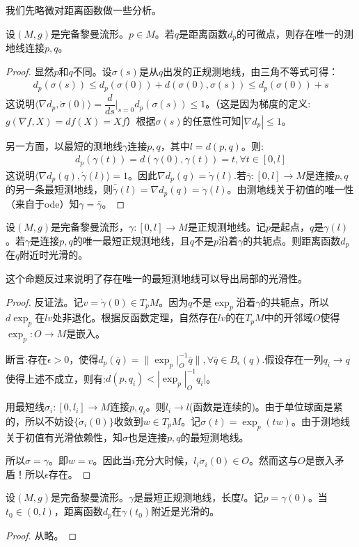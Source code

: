 我们先略微对距离函数做一些分析。
\begin{proposition}
    设$(M,g)$是完备黎曼流形。$p \in M$。若$q$是距离函数$d_p$的可微点，则存在唯一的测地线连接$p,q$。
\end{proposition}
\begin{proof}
    显然$p$和$q$不同。设$\sigma(s)$是从$q$出发的正规测地线，由三角不等式可得：
    \begin{align*}
        d_p(\sigma(s))\leq d_p(\sigma(0))+d(\sigma(0),\sigma(s))\leq d_p(\sigma(0))+s
    \end{align*}
    这说明$\langle \nabla d_p,\dot{\sigma}(0)\rangle =\dfrac{d}{ds}|_{s=0}d_p(\sigma(s))\leq 1$。（这是因为梯度的定义:$g(\nabla f,X)=df(X)=Xf$）根据$\sigma(s)$的任意性可知$|\nabla d_p|\leq 1$。

    另一方面，以最短的测地线$\gamma$连接$p,q$，其中$l=d(p,q)$。则:
    \begin{align*}
        d_p(\gamma(t))=d(\gamma(0),\gamma(t))=t,\forall t \in [0,l]
    \end{align*}
    这说明$\langle \nabla d_p(q),\dot{\gamma}(l)\rangle =1$。因此$\nabla d_p(q)=\dot{\gamma}(l)$.若$\bar{\gamma}:[0,l]\to M$是连接$p,q$的另一条最短测地线，则$\bar{\dot{\gamma}}(l)=\nabla d_p(q)=\dot{\gamma}(l)$。由测地线关于初值的唯一性（来自于ode）知$\gamma=\bar{\gamma}$。
\end{proof}
\begin{proposition}
    设$(M,g)$是完备黎曼流形，$\gamma:[0,l] \to M$是正规测地线。记$p$是起点，$q$是$\gamma(l)$。若$\gamma$是连接$p,q$的唯一最短正规测地线，且$q$不是$p$沿着$\gamma$的共轭点。则距离函数$d_p$在$q$附近时光滑的。
\end{proposition}
这个命题反过来说明了存在唯一的最短测地线可以导出局部的光滑性。
\begin{proof}
    反证法。记$v=\dot{\gamma}(0) \in T_p M$。因为$q$不是$\exp_p$沿着$\gamma$的共轭点，所以$d\exp_p$在$lv$处非退化。根据反函数定理，自然存在$lv$的在$T_pM$中的开邻域$O$使得$\exp_p:O \to M$是嵌入。

    断言:存在$\epsilon>0$，使得$d_p(\bar{q})=\|\exp_p|_{O}^{-1}\bar{q}\|,\forall \bar{q} \in B_{\epsilon}(q)$.假设存在一列$q_i \to q$使得上述不成立，则有:$d(p,q_i)<|\exp_p|_{O}^{-1}q_i|$。

    用最短线$\sigma_i:[0,l_i]\to M$连接$p,q_i$。则$l_i \to l$(函数是连续的)。由于单位球面是紧的，所以不妨设$\{\dot{\sigma}_i(0)\}$收敛到$w \in T_pM$。记$\sigma(t)=\exp_p(tw)$。由于测地线关于初值有光滑依赖性，知$\sigma$也是连接$p,q$的最短测地线。

    所以$\sigma=\gamma$。即$w=v$。因此当$i$充分大时候，$l_i\dot{\sigma}_i(0) \in O$。然而这与$O$是嵌入矛盾！所以$\epsilon$存在。
\end{proof}
\begin{proposition}
    设$(M,g)$是完备黎曼流形。$\gamma$是最短正规测地线，长度$l$。记$p=\gamma(0)$。当$t_0 \in (0,l)$，距离函数$d_p$在$\gamma(t_0)$附近是光滑的。
\end{proposition}
\begin{proof}
    从略。
\end{proof}

